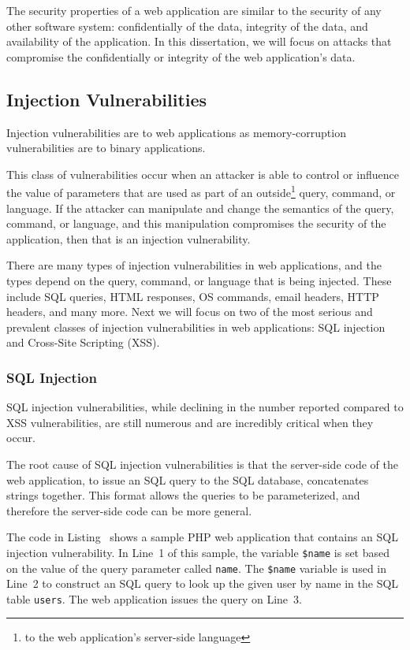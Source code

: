 The security properties of a web application are similar to the
security of any other software system: confidentially of the data,
integrity of the data, and availability of the application. In this
dissertation, we will focus on attacks that compromise the
confidentially or integrity of the web application's data.

\subsection{Injection Vulnerabilities}

Injection vulnerabilities are to web applications as memory-corruption
vulnerabilities are to binary applications. 

This class of vulnerabilities occur when an attacker is able to
control or influence the value of parameters that are used as part of
an outside\footnote{to the web application's server-side language}
query, command, or language. If the attacker can manipulate and change
the semantics of the query, command, or language, and this
manipulation compromises the security of the application, then that is
an injection vulnerability.

There are many types of injection vulnerabilities in web applications,
and the types depend on the query, command, or language that is being
injected. These include SQL queries, HTML responses, OS commands,
email headers, HTTP headers, and many more. Next we will focus on two
of the most serious and prevalent classes of injection vulnerabilities
in web applications: SQL injection and Cross-Site Scripting (XSS).

\subsubsection{SQL Injection}

SQL injection vulnerabilities, while declining in the number reported
compared to XSS vulnerabilities, are still numerous and are incredibly
critical when they occur.

The root cause of SQL injection vulnerabilities is that the
server-side code of the web application, to issue an SQL query to the
SQL database, concatenates strings together. This format allows the
queries to be parameterized, and therefore the server-side code can be
more general.



The code in Listing~ shows a sample PHP web
application that contains an SQL injection vulnerability. In Line~1 of
this sample, the variable \texttt{\$name} is set based on the value of
the query parameter called \texttt{name}. The \texttt{\$name} variable
is used in Line~2 to construct an SQL query to look up the given user
by name in the SQL table \texttt{users}. The web application issues
the query on Line~3.

